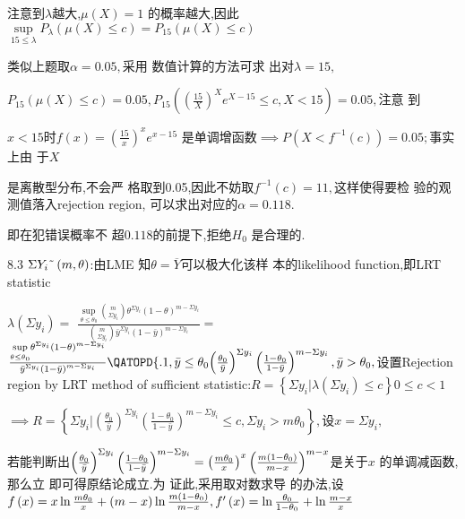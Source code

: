 \documentclass{ctexart}
\begin{document}
注意到$\lambda $越大,$\mu \left( X\right) =1$%
的概率越大,因此$\underset{15\leq
\lambda }{\sup }P_{\lambda }\left( \mu \left( X\right) \leq c\right)
=P_{15}\left( \mu \left( X\right) \leq c\right) $

类似上题取$\alpha =0.05,$采用%
数值计算的方法可求%
出对$\lambda =15,$

$P_{15}\left( \mu \left( X\right) \leq c\right) =0.05,P_{15}\left( \left( 
\frac{15}{X}\right) ^{X}e^{X-15}\leq c,X<15\right) =0.05,$注意%
到

$x<15$时$f\left( x\right) =\left( \frac{15}{x}\right) ^{x}e^{x-15}$%
是单调增函数$\implies P\left(
X<f^{-1}\left( c\right) \right) =0.05;$事实上由%
于$X$

是离散型分布,不会严%
格取到0.05,因此不妨取$%
f^{-1}\left( c\right) =11,$这样使得要检%
验的观测值落入rejection region,%
可以求出对应的$\alpha =0.118.$

\bigskip 即在犯错误概率不%
超$0.118$的前提下,拒绝$H_{0}$%
是合理的.

8.3 $\Sigma Y_{i}\symbol{126}\left( m,\theta \right) $:由LME 知$%
\theta =\overline{Y}$可以极大化该样%
本的likelihood function,即LRT statistic

$\lambda \left( \Sigma y_{i}\right) =$ $\frac{\underset{\theta \leq \theta
_{0}}{\sup }\binom{m}{\Sigma y_{i}}\theta ^{\Sigma y_{i}}\left( 1-\theta
\right) ^{m-\Sigma y_{i}}}{\binom{m}{\Sigma y_{i}}\bar{y}^{\Sigma
y_{i}}\left( 1-\bar{y}\right) ^{m-\Sigma y_{i}}}=$ $\frac{\underset{\theta
\leq \theta _{0}}{\sup }\theta ^{\Sigma y_{i}}\left( 1-\theta \right)
^{m-\Sigma y_{i}}}{\bar{y}^{\Sigma y_{i}}\left( 1-\bar{y}\right) ^{m-\Sigma
y_{i}}}\QATOPD\{ . {1,\bar{y}\leq \theta _{0}}{\left( \frac{\theta _{0}}{%
\bar{y}}\right) ^{\Sigma y_{i}}\left( \frac{1-\theta _{0}}{1-\bar{y}}\right)
^{m-\Sigma y_{i}},\bar{y}>\theta _{0}},$设置Rejection region by
LRT method of sufficient statistic:$R=\left\{ \Sigma y_{i}|\lambda \left(
\Sigma y_{i}\right) \leq c\right\} 0\leq c<1$

$\implies R=\left\{ \Sigma y_{i}|\left( \frac{\theta _{0}}{\bar{y}}\right)
^{\Sigma y_{i}}\left( \frac{1-\theta _{0}}{1-\bar{y}}\right) ^{m-\Sigma
y_{i}}\leq c,\Sigma y_{i}>m\theta _{0}\right\} ,$设$x=\Sigma y_{i},$

若能判断出$\left( \frac{\theta _{0}}{\bar{y}}%
\right) ^{\Sigma y_{i}}\left( \frac{1-\theta _{0}}{1-\bar{y}}\right)
^{m-\Sigma y_{i}}=\left( \frac{m\theta _{0}}{x}\right) ^{x}\left( \frac{%
m\left( 1-\theta _{0}\right) }{m-x}\right) ^{m-x}$是关于$x$%
的单调减函数,那么立%
即可得原结论成立.为%
证此,采用取对数求导%
的办法,设$f\left( x\right) =x\ln \frac{m\theta _{0}}{%
x}+\left( m-x\right) \ln \frac{m\left( 1-\theta _{0}\right) }{m-x},f^{\prime
}\left( x\right) =\ln \frac{\theta _{0}}{1-\theta _{0}}+\ln \frac{m-x}{x}$
\end{document}
